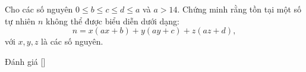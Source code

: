 \ifshowproblem
\begin{problem}\label{problem:RUS-2015-TMO-S-P6}
    Cho các số nguyên \( 0 \leq b \leq c \leq d \leq a \) và \( a > 14 \).  
    Chứng minh rằng tồn tại một số tự nhiên \( n \) không thể được biểu diễn dưới dạng:
    \[
        n = x(ax + b) + y(ay + c) + z(az + d),
    \]
    với \( x, y, z \) là các số nguyên.
\end{problem}
\fi

\ifshowinfo
Đánh giá [\textbf{}]\footnotemark
{}
\fi